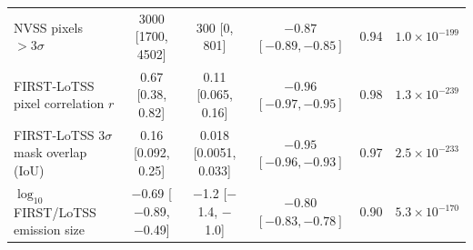 \begin{table}
\begin{tabular}{lccccc}
NVSS pixels $>3\sigma$ & 3000 [1700, 4502] & 300 [0, 801] & $-0.87$ $[-0.89, -0.85]$ & 0.94 & $1.0\times10^{-199}$ \\
FIRST-LoTSS pixel correlation $r$ & 0.67 [0.38, 0.82] & 0.11 [0.065, 0.16] & $-0.96$ $[-0.97, -0.95]$ & 0.98 & $1.3\times10^{-239}$ \\
FIRST-LoTSS $3\sigma$ mask overlap (IoU) & 0.16 [0.092, 0.25] & 0.018 [0.0051, 0.033] & $-0.95$ $[-0.96, -0.93]$ & 0.97 & $2.5\times10^{-233}$ \\
$\log_{10}$ FIRST/LoTSS emission size & $-$0.69 [$-$0.89, $-$0.49] & $-$1.2 [$-$1.4, $-$1.0] & $-0.80$ $[-0.83, -0.78]$ & 0.90 & $5.3\times10^{-170}$ \\
\hline
\end{tabular}
\end{table}
